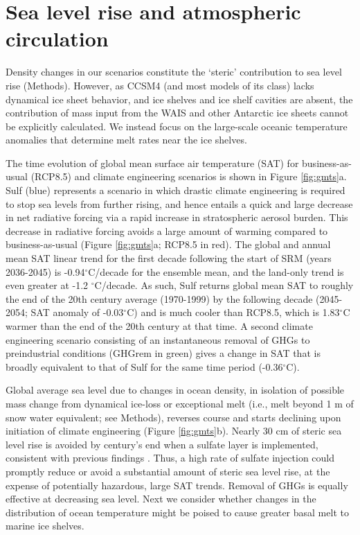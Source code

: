 \documentclass{nature}
\begin{document}
\section{Sea level rise and atmospheric circulation}

Density changes in our scenarios constitute the `steric' contribution to sea level rise (Methods). However, as CCSM4 (and most models of its class) lacks dynamical ice sheet behavior, and ice shelves and ice shelf cavities are absent, the contribution of mass input from the WAIS and other Antarctic ice sheets cannot be explicitly calculated. We instead focus on the large-scale oceanic temperature anomalies that determine melt rates near the ice shelves. 

The time evolution of global mean surface air temperature (SAT) for business-as-usual (RCP8.5) and climate engineering scenarios is shown in Figure \ref{fig:gmts}a. Sulf (blue) represents a scenario in which drastic climate engineering is required to stop sea levels from further rising, and hence entails a quick and large decrease in net radiative forcing via a rapid increase in stratospheric aerosol burden. This decrease in radiative forcing avoids a large amount of warming compared to business-as-usual (Figure \ref{fig:gmts}a; RCP8.5 in red). The global and annual mean SAT linear trend for the first decade following the start of SRM (years 2036-2045) is -0.94$^\circ$C/decade for the ensemble mean, and the land-only trend is even greater at -1.2 $^\circ$C/decade. As such, Sulf returns global mean SAT to roughly the end of the 20th century average (1970-1999) by the following decade (2045-2054; SAT anomaly of -0.03$^\circ$C) and is much cooler than RCP8.5, which is 1.83$^\circ$C warmer than the end of the 20th century at that time. A second climate engineering scenario consisting of an instantaneous removal of GHGs to preindustrial conditions (GHGrem in green) gives a change in SAT that is broadly equivalent to that of Sulf for the same time period (-0.36$^\circ$C).

Global average sea level due to changes in ocean density, in isolation of possible mass change from dynamical ice-loss or exceptional melt (i.e., melt beyond 1 m of snow water equivalent; see Methods), reverses course and starts declining upon initiation of climate engineering (Figure \ref{fig:gmts}b). Nearly 30 cm of steric sea level rise is avoided by century's end when a sulfate layer is implemented, consistent with previous findings \cite{irvine12}. Thus, a high rate of sulfate injection could promptly reduce or avoid a substantial amount of steric sea level rise, at the expense of potentially hazardous, large SAT trends. Removal of GHGs is equally effective at decreasing sea level. Next we consider whether changes in the distribution of ocean temperature might be poised to cause greater basal melt to marine ice shelves. 
\end{document}
